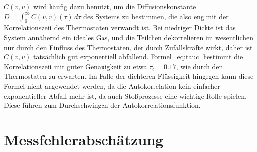 $C(v,v)$ wird häufig dazu benutzt, um die Diffusionskonstante $D =
\int_0^{\infty} C(v,v)(\tau)\, d\tau$ des Systems zu bestimmen, die
also eng mit der Korrelationszeit des Thermostaten verwandt ist.  Bei
niedriger Dichte ist das System annähernd ein ideales Gas, und die
Teilchen dekorrelieren im wesentlichen nur durch den Einfluss des
Thermostaten, der durch Zufallskräfte wirkt, daher ist $C(v,v)$
tatsächlich gut exponentiell abfallend.  Formel~\eqref{eq:tauc}
bestimmt die Korrelationszeit mit guter Genauigkeit zu etwa
$\tau_c=0.17$, wie durch den Thermostaten zu erwarten. Im Falle der
dichteren Flüssigkeit hingegen kann diese Formel nicht angewendet
werden, da die Autokorrelation kein einfacher exponentieller Abfall
mehr ist, da auch Stoßprozesse eine wichtige Rolle spielen. Diese
führen zum Durchschwingen der Autokorrelationsfunktion.

\section{Messfehlerabschätzung}

